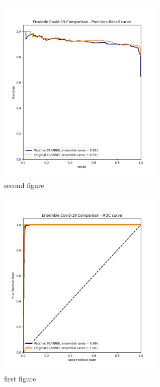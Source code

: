 \documentclass{sigkddExp}
\begin{document}
\begin{figure}
    \centering

    \centering
    \includegraphics[width=8cm]{../doc/images/ensemble_covid_19_comparison_precision_recall_curve.png}
    \caption{second figure}
\end{figure}
\begin{figure}
    \centering
    \includegraphics[width=8cm]{../doc/images/ensemble_covid_19_comparison_roc_curve.png}
    \caption{first figure}
\end{figure}
\end{document}
